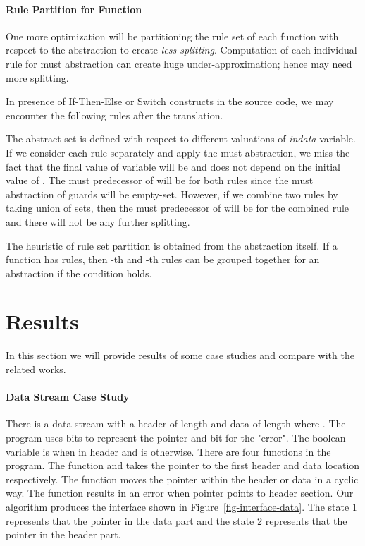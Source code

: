 \documentclass{llncs}
\begin{document}
\paragraph{Rule Partition for Function}
One more optimization will be partitioning the rule set of each function with respect to the abstraction
to create {\em less splitting}. 
Computation of each individual rule for must abstraction can create huge under-approximation; hence may need more splitting.
\begin{example}
In presence of If-Then-Else or Switch constructs in the source code, we may encounter the following rules after the translation. 

The abstract set  is defined with respect to different valuations of {\em indata} variable.
If we consider each rule separately and apply the must abstraction, we miss the fact that the final value
of  variable  will be  and does not depend on the initial value of .
The must predecessor of  will be  for both rules since
the must abstraction of guards will be empty-set. 
However, if we combine two rules by taking union of sets, then the must predecessor of  will be  for the combined rule and there will not be any further splitting.
\end{example}
The heuristic of rule set partition is obtained from the abstraction itself. 
If a function  has  rules, then -th and -th rules can be grouped together for an abstraction 
 if  the condition   holds. 























\section{Results}
In this section we will provide results of some case studies and  compare with the related works.

\paragraph{Data Stream Case Study} There is a data stream with a header of length  and data of length  where .
The program uses  bits to represent the pointer and  bit for the "error".
The boolean variable  is  when in header and is  otherwise. 
There are four functions in the program.
The function  and  takes the pointer to the first header and data location respectively. 
The function  moves the pointer within the header or data in a cyclic way.
The function  results in an error when pointer points to header section.
Our algorithm produces the interface shown in Figure~\ref{fig-interface-data}.
 The state 1 represents that the pointer in the data part and the state 2 represents that the pointer in the header part.
\end{document}

